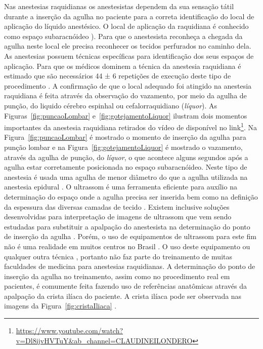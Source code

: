 Nas anestesias raquidianas os anestesistas dependem da sua sensação tátil durante a inserção da agulha no paciente para a correta identificação do local de aplicação do líquido anestésico. O local de aplicação da raquidiana é conhecido como espaço subaracnóideo \cite{Miller2009}). Para que o anestesista reconheça a chegada da agulha neste local ele precisa reconhecer os tecidos perfurados no caminho dela. As anestesias possuem técnicas específicas para identificação dos seus espaços de aplicação. Para que os médicos dominem a técnica da anestesia raquidiana é estimado que são necessários 44 ± 6 repetições de execução deste tipo de procedimento \cite{Kopacz1996}. A confirmação de que o local adequado foi atingido na anestesia raquidiana é feita através da observação do vazamento, por meio da agulha de punção, do liquido cérebro espinhal ou cefalorraquidiano (\textit{líquor}). As Figuras~\ref{fig:puncaoLombar} e~\ref{fig:gotejamentoLiquor} ilustram dois momentos importantes da anestesia raquidiana retirados do vídeo de \textcite{Londero2018} disponível no link\footnote{\url{https://www.youtube.com/watch?v=Dl8ijvHVTuY&ab_channel=CLAUDINEILONDERO}}. Na Figura~\ref{fig:puncaoLombar} é mostrado o momento de inserção da agulha para punção lombar e na Figura~\ref{fig:gotejamentoLiquor} é mostrado o vazamento, através da agulha de punção, do \textit{líquor}, o que acontece alguns segundos após a agulha estar corretamente posicionada no espaço subaracnóideo. Neste tipo de anestesia é usada uma agulha de menor diâmetro do que a agulha utilizada na anestesia epidural \cite{Miller2009}. O ultrassom é uma ferramenta eficiente para auxílio na determinação do espaço onde a agulha precisa ser inserida \cite{Helayel2010, Soni2019} bem como na definição da espessura das diversas camadas de tecido \cite{Klingensmith2022}. Existem inclusive soluções desenvolvidas para interpretação de imagens de ultrassom que vem sendo estudadas para substituir a apalpação do anestesista na determinação do ponto de inserção da agulha \cite{Ni2021}. Porém, o uso de equipamentos de ultrassom para este fim não é uma realidade em muitos centros no Brasil \cite{Hamaji2016}. O uso deste equipamento ou qualquer outra técnica \cite{Berde2022}, portanto não faz parte do treinamento de muitas faculdades de medicina para anestesias raquidianas. A determinação do ponto de inserção da agulha no treinamento, assim como no procedimento real em pacientes, é comumente feita fazendo uso de referências anatômicas através da apalpação da crista ilíaca do paciente. A crista ilíaca pode ser observada nas imagens da Figura~\ref{fig:cristaIliaca} \cite{Moura2019}. 

